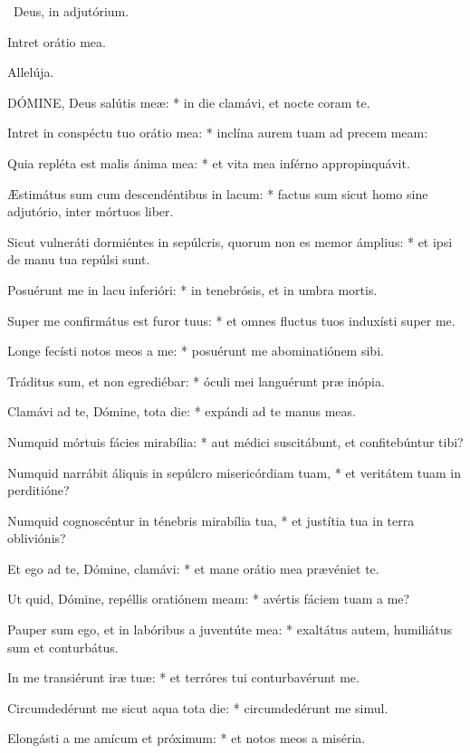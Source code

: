 \V\ Deus, in adjutórium.


 Intret orátio mea.


 Allelúja.


\lettrine[lines=2]{D}{ÓMINE}, Deus salútis meæ: * in die clamávi, et nocte coram te.

Intret in conspéctu tuo orátio mea: * inclína aurem tuam ad precem meam:

Quia repléta est malis ánima mea: * et vita mea inférno appropinquávit.

Æstimátus sum cum descendéntibus in lacum: * factus sum sicut homo sine adjutório, inter mórtuos liber.

Sicut vulneráti dormiéntes in sepúlcris, quorum non es memor ámplius: * et ipsi de manu tua repúlsi sunt.

Posuérunt me in lacu inferióri: * in tenebrósis, et in umbra mortis.

Super me confirmátus est furor tuus: * et omnes fluctus tuos induxísti super me.

Longe fecísti notos meos a me: * posuérunt me abominatiónem sibi.

Tráditus sum, et non egrediébar: * óculi mei languérunt præ inópia.

Clamávi ad te, Dómine, tota die: * expándi ad te manus meas.

Numquid mórtuis fácies mirabília: * aut médici suscitábunt, et confitebúntur tibi?

Numquid narrábit áliquis in sepúlcro misericórdiam tuam, * et veritátem tuam in perditióne?

Numquid cognoscéntur in ténebris mirabília tua, * et justítia tua in terra obliviónis?

Et ego ad te, Dómine, clamávi: * et mane orátio mea prævéniet te.

Ut quid, Dómine, repéllis oratiónem meam: * avértis fáciem tuam a me?

Pauper sum ego, et in labóribus a juventúte mea: * exaltátus autem, humiliátus sum et conturbátus.

In me transiérunt iræ tuæ: * et terróres tui conturbavérunt me.

Circumdedérunt me sicut aqua tota die: * circumdedérunt me simul.

Elongásti a me amícum et próximum: * et notos meos a miséria.

